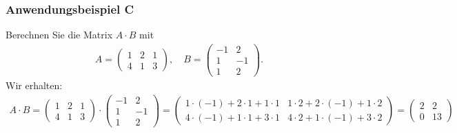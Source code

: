 \subsubsection*{Anwendungsbeispiel C}
Berechnen Sie die Matrix $A \cdot B$ mit 
\begin{align*}
A 
=
\begin{pmatrix}
1 &  2  & 1\\
4 & 1 & 3
\end{pmatrix},
\quad
B = 
\begin{pmatrix}
-1 & 2\\ 
 1 & -1\\
   1 & 2
\end{pmatrix}.
\end{align*}
Wir erhalten: 
\begin{align*}
A \cdot B
= 
\begin{pmatrix}
1 &  2  & 1\\
4 & 1 & 3
\end{pmatrix}
\cdot
\begin{pmatrix}
-1 & 2\\ 
 1 & -1\\
   1 & 2
\end{pmatrix}
= 
\begin{pmatrix}
1 \cdot (-1) + 2 \cdot 1  + 1 \cdot 1 & 1 \cdot 2 + 2 \cdot (-1) +1 \cdot 2\\
4 \cdot (-1) + 1 \cdot 1 + 3 \cdot 1 & 4 \cdot 2 + 1 \cdot (-1) + 3 \cdot 2
\end{pmatrix}
= 
\begin{pmatrix}
2 & 2\\
0 & 13
\end{pmatrix}
\end{align*}

